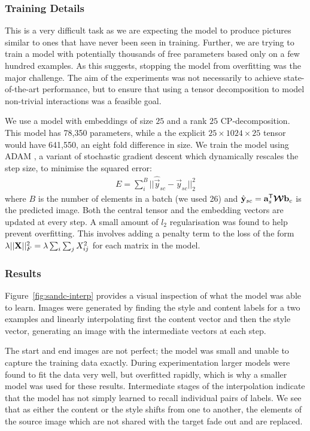 \subsubsection{Training Details}
This is a very difficult task as we are expecting the model to produce pictures similar to ones
that have never been seen in training. Further, we are trying to train a model with potentially
thousands of free parameters based only on a few hundred examples. As this suggests, stopping
the model from overfitting was the major challenge. The aim of the experiments was not
necessarily to achieve state-of-the-art performance, but to ensure that using a tensor
decomposition to model non-trivial interactions was a feasible goal.

We use a model with
embeddings of size \(25\) and a rank \(25\) CP-decomposition. This model has 78,350
parameters, while a the explicit \(25 \times 1024 \times 25\) tensor
would have 641,550, an eight fold difference in size. 
We train the model using ADAM \autocite{Kingma2014}, a variant of
stochastic gradient descent which dynamically rescales the step size, to minimise the squared error:
\begin{align}
	E = \sum_{i}^B ||\hat{\vec{y}}_{sc} - \vec{y}_{sc}||_2^2
\end{align} where \(B\) is the number of elements in a batch (we used 26) and
\(\hat{\mathbf{y}}_{sc} = \mathbf{a}_s^\mathsf{T}\bm{\mathcal{W}}\mathbf{b}_c\) is the predicted image. Both
the central tensor and the embedding vectors are updated at every step. A small amount
of \(l_2\) regularisation was found to help prevent overfitting. This involves adding a penalty
term to the loss of the form \(\lambda||\mathbf{X}||_F^2 = \lambda\sum_i\sum_jX_{ij}^2\) for
each matrix in the model.

\subsubsection{Results}
Figure~\ref{fig:sandc-interp} provides a visual inspection of what the model was able to
learn. Images were generated by finding the style and content labels for a two examples and
linearly interpolating first the content vector and then the style vector, generating an
image with the intermediate vectors at each step. 

The start and end images are not perfect; the model was small and unable to capture the training
data exactly. During experimentation larger models were found to fit the data very well, but 
overfitted rapidly, which is why a smaller model was used for these results.
Intermediate stages of the interpolation indicate that the model has
not simply learned to recall individual pairs of labels. We see that as either the content or
the style shifts from one to another, the elements of the source image which are not shared with
the target fade out and are replaced.

